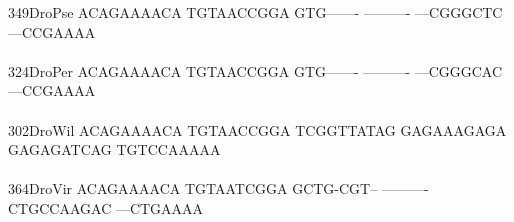 \documentclass[11pt,twoside,reqno,a4paper]{article}
\begin{document}
{349\hspace*{1\charwidth}DroPse	ACAGAAAACA	TGTAACCGGA	GTG-------	----------	---CGGGCTC	---CCGAAAA	\\
\hspace*{4\charwidth}\hspace*{7\charwidth}\hspace*{1\charwidth}\hspace*{1\charwidth}\hspace*{1\charwidth}\hspace*{1\charwidth}\hspace*{1\charwidth}\hspace*{1\charwidth}\\
324\hspace*{1\charwidth}DroPer	ACAGAAAACA	TGTAACCGGA	GTG-------	----------	---CGGGCAC	---CCGAAAA	\\
\hspace*{4\charwidth}\hspace*{7\charwidth}\hspace*{1\charwidth}\hspace*{1\charwidth}\hspace*{1\charwidth}\hspace*{1\charwidth}\hspace*{1\charwidth}\hspace*{1\charwidth}\\
302\hspace*{1\charwidth}DroWil	ACAGAAAACA	TGTAACCGGA	TCGGTTATAG	GAGAAAGAGA	GAGAGATCAG	TGTCCAAAAA	\\
\hspace*{4\charwidth}\hspace*{7\charwidth}\hspace*{1\charwidth}\hspace*{1\charwidth}\hspace*{1\charwidth}\hspace*{1\charwidth}\hspace*{1\charwidth}\hspace*{1\charwidth}\\
364\hspace*{1\charwidth}DroVir	ACAGAAAACA	TGTAATCGGA	GCTG-CGT--	----------	CTGCCAAGAC	---CTGAAAA	\\
\hspace*{4\charwidth}\hspace*{7\charwidth}\hspace*{1\charwidth}\hspace*{1\charwidth}\hspace*{1\charwidth}\hspace*{1\charwidth}\hspace*{1\charwidth}\hspace*{1\charwidth}\\
}
\end{document}
